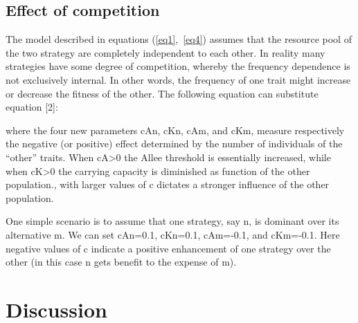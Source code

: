 \documentclass[preprint,authoryear]{elsarticle}
\begin{document}


\subsection{Effect of competition}

The model described in equations  (\ref{eq1},~\ref{eq4}) assumes that the resource pool of the two strategy are completely independent to each other. In reality many strategies have some degree of competition, whereby the frequency dependence is not exclusively internal. In other words, the frequency of one trait might increase or decrease the fitness of the other. The following equation can substitute equation [2]: 


where the four new parameters cAn, cKn, cAm, and cKm, measure respectively the negative (or positive) effect determined by the number of individuals of the “other” traits. When cA>0 the Allee threshold is essentially increased, while when cK>0 the carrying capacity is diminished as function of the other population., with larger values of c dictates a stronger influence of the other population. 

One simple scenario is to assume that one strategy, say n, is dominant over its alternative m. We can  set cAn=0.1,  cKn=0.1,  cAm=-0.1, and  cKm=-0.1. Here negative values of c indicate a positive enhancement of one strategy over the other (in this case n gets benefit to the expense of m). 















\section{Discussion}
\end{document}

